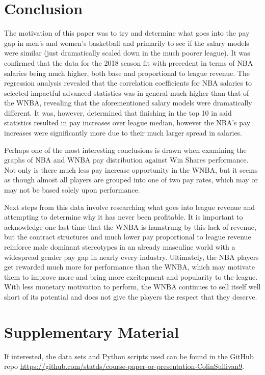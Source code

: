 \documentclass[12pt]{article}
\begin{document}
\section{Conclusion}
\hspace*{10mm}
The motivation of this paper was to try and determine what goes into the pay gap in men’s and women’s basketball and primarily to see if the salary 
models were similar (just dramatically scaled down in the much poorer league). It was confirmed that the data for the 2018 season fit with precedent 
in terms of NBA salaries being much higher, both base and proportional to league revenue. The regression analysis revealed that the correlation 
coefficients for NBA salaries to selected impactful advanced statistics was in general much higher than that of the WNBA, revealing that the 
aforementioned salary models were dramatically different. It was, however, determined that finishing in the top 10 in said statistics resulted in pay 
increases over league median, however the NBA’s pay increases were significantly more due to their much larger spread in salaries. 
\par
Perhaps one of the most interesting conclusions is drawn when examining the graphs of NBA and WNBA pay distribution against Win Shares performance. 
Not only is there much less pay increase opportunity in the WNBA, but it seems as though almost all players are grouped into one of two pay rates, 
which may or may not be based solely upon performance.
\par
Next steps from this data involve researching what goes into league revenue and attempting to determine why it has never been profitable. 
It is important to acknowledge one last time that the WNBA is hamstrung by this lack of revenue, but the contract structures and much lower 
pay proportional to league revenue reinforce male dominant stereotypes in an already masculine world with a widespread gender pay gap in nearly
every industry. Ultimately, the NBA players get rewarded much more for performance than the WNBA, which may motivate them to improve more and bring 
more excitepment and popularity to the league. With less monetary motivation to perform, the WNBA continues to sell itself well short of its potential 
and does not give the players the respect that they deserve. 

\section{Supplementary Material}
If interested, the data sets and Python scripts used can be found in the GitHub repo \url{https://github.com/statds/course-paper-or-presentation-ColinSullivan9}.



\end{document}
